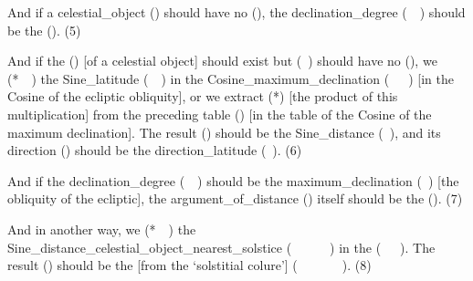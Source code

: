 And if a \gls{celestial_object} (\kawkab) should have no  (\ard), the \gls{declination_degree} (\mayl\idafaconsonant\ \daraji\idafavowel\ \uy) should be the  (\bud). (5)

And if the  (\ard) [of a celestial object] should exist but  (\daraji\idafavowel\ \uy)  should have no   (\mayl), we   (*\munhatt\idafaconsonant\ \darb\ \kardan) the \gls{Sine_latitude} (\jayb\idafaconsonant\ \ard\idafaconsonant\ \uy) in the \gls{Cosine_maximum_declination} (\jayb\idafaconsonant\ \tamam\idafaconsonant\ \mayl\idafaconsonant\ \kulli)  [\ie  in the Cosine of the ecliptic obliquity], or we \gls{extract} (*\darardan) [the product of this multiplication] from the preceding \gls{table} (\jadval) [\ie in the table of the Cosine of the maximum declination]. The \gls{result} (\hasil) should be the \gls{Sine_distance} (\jayb\idafaconsonant\ \bud), and its \gls{direction} (\jahat) should be the \gls{direction_latitude} (\jahat\idafaconsonant\ \ard). (6) 

And if the \gls{declination_degree} (\mayl\idafaconsonant\ \daraji\idafavowel\ \uy) should be the \gls{maximum_declination} (\mayl\idafaconsonant\ \kulli) [\ie the obliquity of the ecliptic], the \gls{argument_of_distance} (\hissatalbud) itself should be the  (\bud). (7)
\bigskip


And in another way, we  (*\munhatt\idafaconsonant\ \darb\ \kardan) the \gls{Sine_distance_celestial_object_nearest_solstice} (\jayb\idafaconsonant\ \bud\idafaconsonant\ \daraji\idafavowel\ \kawkab\ \az\ \inqilab\idafaconsonant\ \aqrab) in the  (\jayb\idafaconsonant\ \tamam\idafaconsonant\ \ard\idafaconsonant\ \kawkab). The \gls{result} (\hasil) should be the
 [\ie from the `solstitial colure'] (\jayb\idafaconsonant\ \bud\idafaconsonant\ \kawkab\ \az\ \guillemotleft\dayiri\idafavowel\ \marri\ \biaqtab\idafaconsonant\ \arbai\guillemotright). (8)


